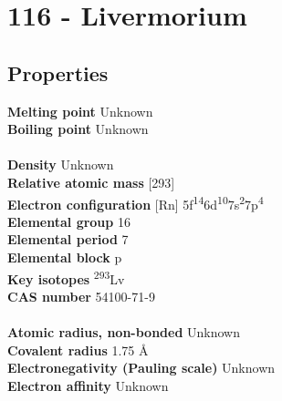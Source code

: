 \section{116 - Livermorium}
\label{sec:elem-livermorium}
\subsection{Properties}
\textbf{Melting point} Unknown\\
\textbf{Boiling point} Unknown\\
\\
\textbf{Density} Unknown\\
\textbf{Relative atomic mass} [293]\\
\textbf{Electron configuration} [Rn] 5f\textsuperscript{14}6d\textsuperscript{10}7s\textsuperscript{2}7p\textsuperscript{4}\\
\textbf{Elemental group} 16\\
\textbf{Elemental period} 7\\
\textbf{Elemental block} p\\
\textbf{Key isotopes} \textsuperscript{293}Lv\\
\textbf{CAS number} 54100-71-9\\
\\
\textbf{Atomic radius, non-bonded} Unknown\\
\textbf{Covalent radius} 1.75 Å\\
\textbf{Electronegativity (Pauling scale)} Unknown\\
\textbf{Electron affinity} Unknown\\